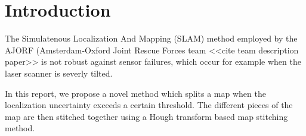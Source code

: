 \chapter{Introduction}
\label{chapter:introduction}
The Simulatenous Localization And Mapping (SLAM) method employed by the AJORF (Amsterdam-Oxford Joint Rescue Forces team <<cite team description paper>> is not robust against sensor failures, which occur for example when the laser scanner is severly tilted. 

In this report, we propose a novel method which splits a map when the localization uncertainty exceeds a certain threshold. The different pieces of the map are then stitched together using a Hough transform based map stitching method.